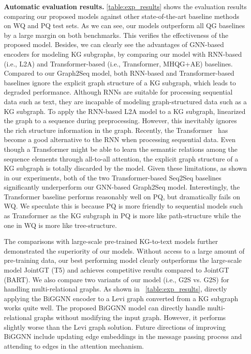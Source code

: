 \documentclass[journal]{IEEEtran}
\begin{document}
\noindent\textbf{Automatic evaluation results.}
\cref{table:exp_results} shows the evaluation results comparing our proposed models against other state-of-the-art baseline methods on WQ and PQ test sets.
As we can see, our models outperform all QG baselines by a large margin on both benchmarks.
This verifies the effectiveness of the proposed model.
Besides, we can clearly see the advantages of GNN-based encoders for modeling KG subgraphs, by comparing our model with RNN-based (i.e., L2A) and Transformer-based (i.e., Transformer, MHQG+AE) baselines.
Compared to our Graph2Seq model, both RNN-based and Transformer-based baselines ignore the explicit graph structure of a KG subgraph, which leads to degraded performance.
Although RNNs are suitable for processing sequential data such as text, they are incapable of modeling graph-structured data such as a KG subgraph.
To apply the RNN-based L2A model to a KG subgraph, 
\cite{kumar2019difficulty} linearized the graph to a sequence during preprocessing.
However, this inevitably ignores the rich structure information in the graph.
Recently, the Transformer~\cite{vaswani2017attention} has become a good alternative to the RNN when processing sequential data.
Even though a Transformer might be able to learn the semantic relations among the sequence elements through all-to-all attention, 
the explicit graph structure of a KG subgraph is totally discarded by the model.
Given these limitations, as shown in our experiments,  both of the two Transformer-based Seq2Seq baselines significantly underperform our GNN-based Graph2Seq model.
Interestingly, the Transformer baseline performs reasonably well on PQ,
but dramatically fails on WQ.
We speculate this is because PQ is more friendly to sequential models such as Transformer as the KG subgraph in PQ is more like path-structure
while the one in WQ is more like tree-structure.


The comparisons with large-scale pre-trained KG-to-text models further demonstrated the superiority of our models. Without access to a large amount of pre-training data, our best performing model clearly outperforms the large-scale model JointGT (T5) and achieves competitive results compared to JointGT (BART).
We also compare two variants of our model (i.e., G2S vs. G2S) for handling multi-relational graphs.
As shown in ~\cref{table:exp_results}, directly applying the BiGGNN encoder to a Levi graph converted from a KG subgraph works quite well.
The proposed BiGGNN model can directly handle multi-relational graphs without modifying the input graph.
However, it performs slightly worse than the Levi graph solution.
Future directions of improving BiGGNN include updating edge embeddings in the message passing process and attending to edges in the attention mechanism.
\end{document}
